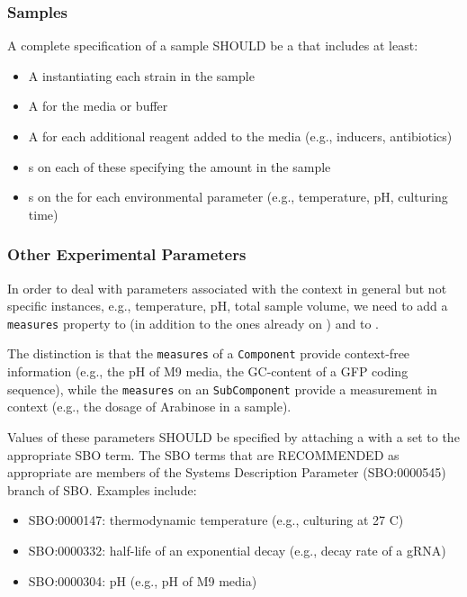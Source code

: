 \subsubsection{Samples}

A complete specification of a sample SHOULD be a  that includes at least:
\begin{itemize}
\item A  instantiating each strain in the sample
\item A  for the media or buffer
\item A  for each additional reagent added to the media (e.g., inducers, antibiotics)
\item {}s on each of these specifying the amount in the sample
\item {}s on the  for each environmental parameter (e.g., temperature, pH, culturing time)
\end{itemize}

\subsubsection{Other Experimental Parameters}

In order to deal with parameters associated with the context in general but not specific instances, e.g., temperature, pH, total sample volume, we need to add a \texttt{measures} property to  (in addition to the ones already on ) and to .

The distinction is that the \texttt{measures} of a \texttt{Component} provide context-free information (e.g., the pH of M9 media, the GC-content of a GFP coding sequence), while the \texttt{measures} on an \texttt{SubComponent} provide a measurement in context (e.g., the dosage of Arabinose in a sample).

Values of these parameters SHOULD be specified by attaching a  with a  set to the appropriate SBO term. The SBO terms that are RECOMMENDED as appropriate are members of the Systems Description Parameter (SBO:0000545) branch of SBO. Examples include:
\begin{itemize}
\item SBO:0000147: thermodynamic temperature (e.g., culturing at 27 C)
\item SBO:0000332: half-life of an exponential decay (e.g., decay rate of a gRNA)
\item SBO:0000304: pH (e.g., pH of M9 media)
\end{itemize}


